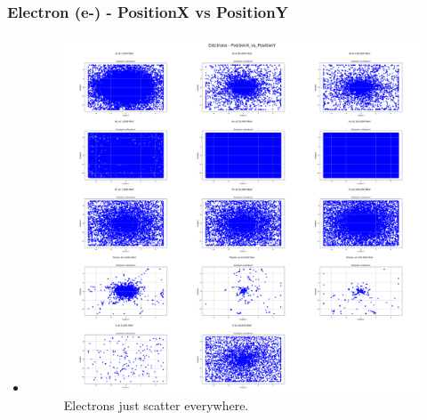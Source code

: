 \documentclass[aspectratio-169]{beamer}
\begin{document}
\begin{frame}
\frametitle{Electron (e-) - PositionX vs PositionY}
\begin{itemize}
    \item 
    \begin{minipage}{0.5\textwidth}
        \begin{figure}
            \centering
            \includegraphics[width=\textwidth]{Combined Plots/PositionX_vs_PositionY_e-.png}
            \footnotesize{Electrons just scatter everywhere.}
        \end{figure}
    \end{minipage}
\end{itemize}
\end{frame}

\end{document}
